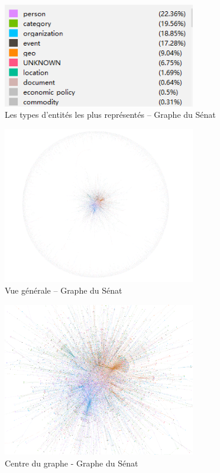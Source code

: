 \documentclass[a4paper,twoside,12pt]{book}
\begin{document}
\begin{figure}
\centering %
\includegraphics[width=0.75\textwidth]{img/senat_entity_type.png}
\caption{Les types d'entités les plus représentés – Graphe du Sénat}
\end{figure}


\begin{figure}
\centering %
\includegraphics[width=0.75\textwidth]{img/senat_general_view.png}
\caption{Vue générale – Graphe du Sénat}
\end{figure}



\begin{figure}
\centering %
\includegraphics[width=0.75\textwidth]{img/senat_close_view.png}
\caption{Centre du graphe - Graphe du Sénat}
\end{figure}
\end{document}
